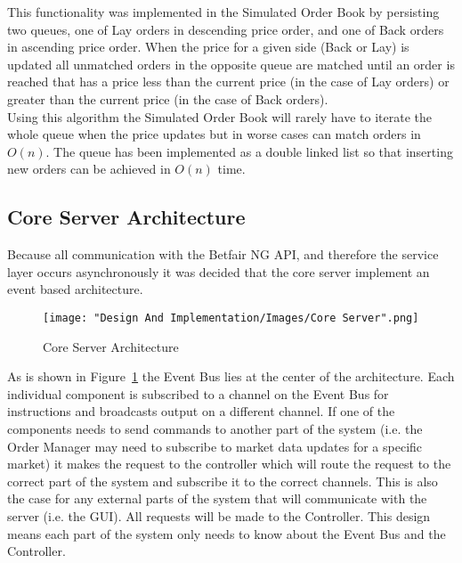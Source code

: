 		This functionality was implemented in the Simulated Order Book by	persisting two queues, one of Lay orders in descending price order, and one of Back orders in ascending price order. When the price for a given side (Back or Lay) is updated all unmatched orders in the opposite queue are matched until an order is reached that has a price less than the current price (in the case of Lay orders) or greater than the current price (in the case of Back orders).\\ 
		
		Using this algorithm the Simulated Order Book will rarely have to iterate the whole queue when the price updates but in worse cases can match orders in $O(n)$. The queue has been implemented as a double linked list so that inserting new orders can be achieved in $O(n)$ time.\\		

	\subsection{Core Server Architecture}
	
		Because all communication with the Betfair NG API, and therefore the service layer occurs asynchronously it was decided that the core server implement an event based architecture.
		
		\begin{figure}[H]
			\texttt{[image: "Design And Implementation/Images/Core Server".png]}
			\centering
			\caption{Core Server Architecture}
    			\label{fig:coreServerArchitecture}
		\end{figure}
		
		As is shown in Figure~\ref{fig:coreServerArchitecture} the Event Bus lies at the center of the architecture. Each individual component is subscribed to a channel on the Event Bus for instructions and broadcasts output on a different channel. If one of the components needs to send commands to another part of the system (i.e. the Order Manager may need to subscribe to market data updates for a specific market) it makes the request to the controller which will route the request to the correct part of the system and subscribe it to the correct channels. This is also the case for any external parts of the system that will communicate with the server (i.e. the GUI). All requests will be made to the Controller. This design means each part of the system only needs to know about the Event Bus and the Controller.\\
		
